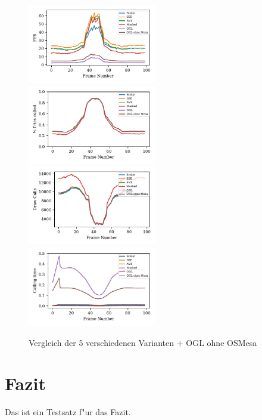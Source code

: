 \documentclass[journal]{vgtc}
\begin{document}
\begin{figure}
	\begin{minipage}{0.5\textwidth}
		\includegraphics[width=0.5\textwidth]{images/Evaluation_6_Results_FPS.pdf}
		\includegraphics[width=0.5\textwidth]{images/Evaluation_6_Results_Percentage culled.pdf}
		\includegraphics[width=0.5\textwidth]{images/Evaluation_6_Results_Draw Calls.pdf}
		\includegraphics[width=0.5\textwidth]{images/Evaluation_6_Results_Culling time.pdf}
		\caption{Vergleich der 5 verschiedenen Varianten + OGL ohne OSMesa}
		\label{fig:performance_OSMesa}
	\end{minipage}
\end{figure}

\section{Fazit}
Das ist ein Testsatz f"ur das Fazit.

 

\end{document}

